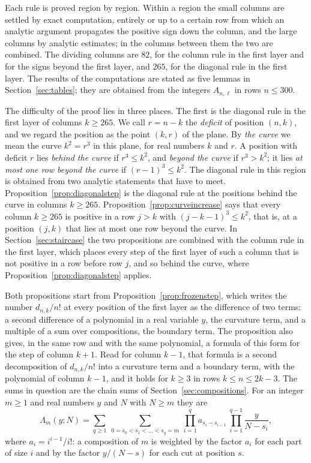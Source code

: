 \documentclass{amsart}
\theoremstyle{definition}
\theoremstyle{remark}
\numberwithin{equation}{section}
\begin{document}
Each rule is proved region by region. Within a region the small columns are
settled by exact computation, entirely or up to a certain row from which an
analytic argument propagates the positive sign down the column, and the
large columns by analytic estimates; in the columns between them the two are
combined. The dividing columns are $82$, for the column rule in the first
layer and for the signs beyond the first layer, and $265$, for the diagonal
rule in the first layer. The results of the computations are stated as five
lemmas in Section~\ref{sec:tables}; they are obtained from the integers
$A_{n,\ell}$ in rows $n\le300$.

The difficulty of the proof lies in three places. The first is the diagonal
rule in the first layer of columns $k\ge265$. We call $r=n-k$ the
\emph{deficit} of position $(n,k)$, and we regard the position as the point
$(k,r)$ of the plane. By \emph{the curve} we mean the curve $k^2=r^3$ in
this plane, for real numbers $k$ and $r$. A
position with deficit $r$ lies \emph{behind the curve} if $r^3\le k^2$, and
\emph{beyond the curve} if $r^3>k^2$; it lies \emph{at most one row beyond
the curve} if $(r-1)^3\le k^2$. The diagonal rule in this region is obtained
from two analytic statements that have to meet.
Proposition~\ref{prop:diagonalstep} is the diagonal rule at the positions
behind the curve in columns $k\ge265$. Proposition~\ref{prop:curveincrease}
says that every column $k\ge265$ is positive in a row $j>k$ with
$(j-k-1)^3\le k^2$, that is, at a position $(j,k)$ that lies at most one
row beyond the curve. In Section~\ref{sec:staircase} the two propositions
are combined with the column rule in the first layer, which places every
step of the first layer of such a column that is not positive in a row
before row $j$, and so behind the curve, where
Proposition~\ref{prop:diagonalstep} applies.

Both propositions start from Proposition~\ref{prop:frozenstep}, which
writes the number $d_{n,k}/n!$ at every position of the first layer as
the difference of two terms: a second difference of a polynomial in a real
variable $y$, the curvature term, and a multiple of a sum over compositions,
the boundary term. The proposition also gives, in the same row and with the
same polynomial, a formula of this form for the step of column $k+1$. Read
for column $k-1$, that formula is a second decomposition of $d_{n,k}/n!$
into a curvature term and a boundary term, with the polynomial of column
$k-1$, and it holds for $k\ge3$ in rows $k\le n\le2k-3$. The sums in
question are the chain sums of
Section~\ref{sec:compositions}. For an integer $m\ge1$ and real numbers $y$
and $N$ with $N\ge m$ they are
\[
\Lambda_m(y;N)=\sum_{q\ge1}\ \sum_{0=s_0<s_1<\dots<s_q=m}\
\prod_{i=1}^{q}a_{s_i-s_{i-1}}\ \prod_{i=1}^{q-1}\frac{y}{N-s_i},
\]
where $a_i=i^{i-1}/i!$: a composition of $m$ is weighted by the factor $a_i$
for each part of size $i$ and by the factor $y/(N-s)$ for each cut at
position $s$.
\end{document}
